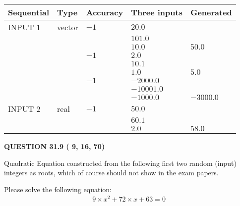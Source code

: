 \documentclass[12pt]{article}
\begin{document}
  
\noindent\begin{tabular}{|l|l|l|l|l|}
\hline
 Sequential & Type & Accuracy & Three inputs & Generated \\ 
\hline
 
 
  INPUT $           1$ & vector & $          -1 $ & $
20.0
  $ & \\
  & & & $
101.0
  $ & \\
  & & & $
10.0
$ & $ 50.0 $ 
  \\
  & & $          -1 $ & $
2.0
  $ & \\
  & & & $
10.1
  $ & \\
  & & & $
1.0
$ & $ 5.0 $ 
  \\
  & & $          -1 $ & $
-2000.0
  $ & \\
  & & & $
-10001.0
  $ & \\
  & & & $
-1000.0
$ & $ -3000.0 $ 
 \\  \hline  
 
 
  INPUT $           2$ & real & $          -1 $ & $
 50.0
  $ & \\
  & & &  $
 60.1
  $ & \\
  & & &  $
 2.0
 $ & $ 58.0 $ 
 \\  \hline  
 \end{tabular}
   
   
  
\vspace{0.2in}
  
{\textbf{\Large{QUESTION
31.9 
 (          9,         16,         70)
}}}
  
  


\noindent{}
Quadratic Equation constructed from the following first two random (input) integers as roots,  
which of course should not show in the exam papers.  
\noindent{}


 
 

 
Please solve the following equation:
\begin{eqnarray*}
9 \times x^2  %
+  %
72
                 \times x    %
+  %
63 =0
\end{eqnarray*}
 
 
 
\noindent{}
 
 
\end{document}
